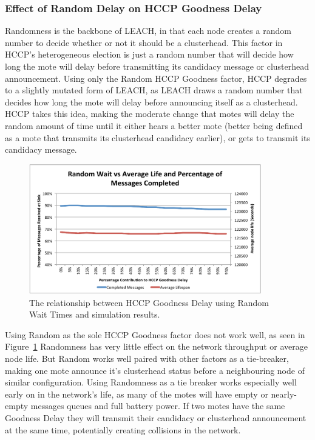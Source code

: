 \subsubsection{Effect of Random Delay on HCCP Goodness Delay}
\label{randomDelay}


Randomness is the backbone of LEACH, in that each node creates a random number
to decide whether or not it should be a clusterhead. This factor in
HCCP's heterogeneous election is just a random number that will decide how long the
mote will delay before transmitting its candidacy message or clusterhead announcement. 
Using only the Random HCCP Goodness factor, HCCP degrades to a slightly mutated form of LEACH, as LEACH
draws a random number that decides how long the mote will delay before announcing itself as a clusterhead. HCCP takes this
idea, making the moderate change that motes will delay the random amount of time until it either
hears a better mote (better being defined as a mote that transmits its clusterhead candidacy earlier), or gets to 
transmit its candidacy message. 

\begin{figure}[tbhp]
	\centering
		\includegraphics[width=0.9\textwidth]{images/simulation/goodness/Random3.pdf}
	\caption{The relationship between HCCP Goodness Delay using Random Wait Times and simulation results.}
	\label{fig:images_simulation_goodness_Random}
\end{figure}


Using Random as the
sole HCCP Goodness factor does not work well, as seen in Figure~\ref{fig:images_simulation_goodness_Random} Randomness
has very little effect on the network throughput or average node life. 
But Random works well paired with other factors 
as a tie-breaker, making one 
mote announce it's clusterhead status before a neighbouring node of similar
configuration. Using Randomness as a tie breaker works especially well early on in the
network's life, as many of the motes will have empty or nearly-empty messages queues and
full battery power. If two motes have the same Goodness Delay they will transmit their
candidacy or clusterhead announcement at the same time, potentially creating collisions
in the network.

